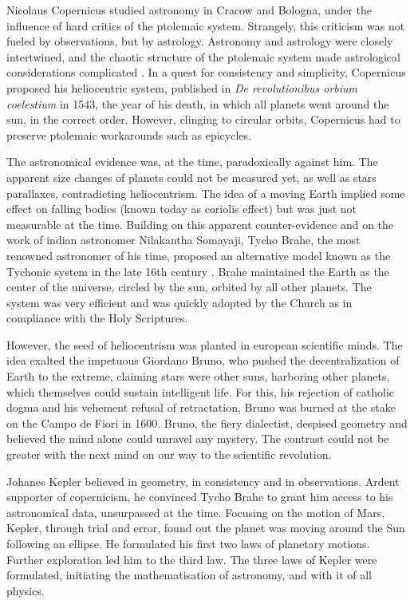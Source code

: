 Nicolaus Copernicus studied astronomy in Cracow and Bologna, under the influence of hard critics of the ptolemaic system. Strangely, this criticism was not fueled by observations, but by astrology. Astronomy and astrology were closely intertwined, and the chaotic structure of the ptolemaic system made astrological considerations complicated \citep{Barker2014}. In a quest for consistency and simplicity, Copernicus proposed his heliocentric system, published in \textit{De revolutionibus orbium coelestium} in 1543, the year of his death, in which all planets went around the sun, in the correct order. However, clinging to circular orbits, Copernicus had to preserve ptolemaic workarounds such as epicycles. 

The astronomical evidence was, at the time, paradoxically against him. The apparent size changes of planets could not be measured yet, as well as stars parallaxes, contradicting heliocentrism. The idea of a moving Earth implied some effect on falling bodies (known today as coriolis effect) but was just not measurable at the time. Building on this apparent counter-evidence and on the work of indian astronomer Nilakantha Somayaji, Tycho Brahe, the most renowned astronomer of his time, proposed an alternative model known as the Tychonic system in the late 16th century \citep{ramasubramanian1998}. Brahe maintained the Earth as the center of the universe, circled by the sun, orbited by all other planets. The system was very efficient and was quickly adopted by the Church as in compliance with the Holy Scriptures.

However, the seed of heliocentrism was planted in european scientific minds. The idea exalted the impetuous Giordano Bruno, who pushed the decentralization of Earth to the extreme, claiming stars were other suns, harboring other planets, which themselves could sustain intelligent life. For this, his rejection of catholic dogma and his vehement refusal of retractation, Bruno was burned at the stake on the Campo de Fiori in 1600. Bruno, the fiery dialectist, despised geometry and believed the mind alone could unravel any mystery. The contrast could not be greater with the next mind on our way to the scientific revolution.

Johanes Kepler believed in geometry, in consistency and in observations. Ardent supporter of copernicism, he convinced Tycho Brahe to grant him access to his astronomical data, unsurpassed at the time. Focusing on the motion of Mars, Kepler, through trial and error, found out the planet was moving around the Sun following an ellipse. He formulated his first two laws of planetary motions. Further exploration led him to the third law. The three laws of Kepler were formulated, initiating the mathematisation of astronomy, and with it of all physics.

